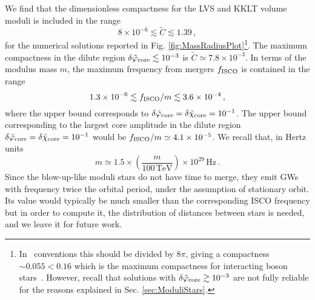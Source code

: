 \documentclass[11pt,a4paper]{article}
\begin{document}
We find that the dimensionless compactness for the LVS and KKLT volume moduli is included in the range
\begin{equation}
8 \times 10^{-6} \lesssim \tilde{C} \lesssim 1.39 \,,
\end{equation}
for the numerical solutions reported in Fig. \ref{fig:MassRadiusPlot}\footnote{In~\cite{Giudice:2016zpa} conventions this should be divided by $8 \pi$, giving a compactness $\sim 0.055 < 0.16$ which is the maximum compactness for interacting boson stars~\cite{AmaroSeoane:2010qx}. However, recall that solutions with $\delta \tilde\varphi_{\rm core} \gtrsim 10^{-3}$ are not fully reliable for the reasons explained in Sec. \ref{sec:ModuliStars}.}. The maximum compactness in the dilute region $\delta\tilde\varphi_{\rm core} \lesssim 10^{-3}$ is $\tilde{C} \simeq 7.8 \times 10^{-3}$. In terms of the modulus mass $m$, the maximum frequency from mergers $f_{\rm ISCO}$ is contained in the range
\begin{equation}
\label{eq:FrequencyWindow}
1.3 \times 10^{-6} \lesssim f_{\rm ISCO}/m \lesssim 3.6 \times 10^{-4} \,,
\end{equation}
where the upper bound corresponds to $\delta\tilde{\varphi}_{\rm core} = \delta\tilde\chi_{\rm core} = 10^{-1}$. The upper bound corresponding to the largest core amplitude in the dilute region $\delta\tilde\varphi_{\rm core} = \delta\tilde\chi_{\rm core} = 10^{-1}$ would be $f_{\rm ISCO}/m \simeq 4.1 \times 10^{-5}$. We recall that, in Hertz units
\begin{equation}
m \simeq 1.5 \times \left(\frac{m}{100 \, \text{TeV}}\right) \times 10^{29} \, \text{Hz}\,.
\end{equation}
Since the blow-up-like moduli stars do not have time to merge, they emit GWs with frequency twice the orbital period, under the assumption of stationary orbit. Its value would typically be much smaller than the corresponding ISCO frequency but in order to compute it, the distribution of distances between stars is needed, and we leave it for future work.\\
\end{document}
